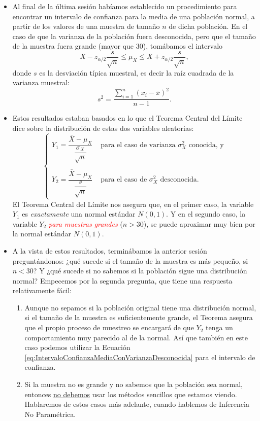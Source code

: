 \begin{itemize}

    \item Al final de la última sesión habíamos establecido un procedimiento para encontrar un intervalo de confianza para la media de una población normal, a partir de los valores de una muestra de tamaño $n$ de dicha población. En el caso de que la varianza de la población fuera desconocida, pero que el tamaño de la muestra fuera grande (mayor que $30$), tomábamos el intervalo
        \begin{equation}\label{eq:IntervaloConfianzaMediaConVarianzaDesconocida}
        \bar X-z_{\alpha/2}\dfrac{s}{\sqrt{n}}\leq \mu_X \leq \bar X+z_{\alpha/2}\dfrac{s}{\sqrt{n}},
        \end{equation}
        donde $s$ es la desviación típica muestral, es decir la raíz cuadrada de la varianza muestral:
        \[s^2=\dfrac{\displaystyle\sum_{i=1}^n(x_i-\bar x)^2}{{n-1}}.\]

    \item Estos resultados estaban basados en lo que el Teorema Central del Límite dice sobre la distribución de estas dos variables aleatorias:
        \[\begin{cases}
        Y_1=\dfrac{\bar X-\mu_X}{\dfrac{\sigma_X}{\sqrt{n}}}&\mbox{ para el caso de varianza $\sigma_X^2$ conocida, y}\\[8mm]
        \quad\\
        Y_2=\dfrac{\bar X-\mu_X}{\dfrac{s}{\sqrt{n}}}&\mbox{ para el caso de $\sigma_X^2$ desconocida.}
        \end{cases}
        \]
        El Teorema Central del Límite nos asegura que, en el primer caso, la variable $Y_1$ es {\em exactamente} una normal estándar $N(0,1)$. Y en el segundo caso, la variable $Y_2$ \textcolor{red}{\em para muestras grandes} ($n>30$), se puede aproximar muy bien por la normal estándar $N(0,1)$.

    \item A la vista de estos resultados, terminábamos la anterior sesión preguntándonos: ¿qué sucede si el tamaño de la muestra es más pequeño, si $n<30$? Y ¿qué sucede si no sabemos si la población sigue una distribución normal? Empecemos por la segunda pregunta, que tiene una respuesta relativamente fácil:
            \begin{enumerate}
            \item Aunque no sepamos si la población original tiene una distribución normal, si el tamaño de la muestra es suficientemente grande, el Teorema asegura que el propio proceso de muestreo se encargará de que $Y_2$ tenga un comportamiento muy parecido al de la normal. Así que también en este caso podemos utilizar la Ecuación \ref{eq:IntervaloConfianzaMediaConVarianzaDesconocida} para el intervalo de confianza.
            \item {\sf Si la muestra no es grande y no sabemos que la población sea normal, entonces \underline{no debemos} usar los métodos sencillos que estamos viendo.} Hablaremos de estos casos más adelante, cuando hablemos de Inferencia No Paramétrica.
            \end{enumerate}


\end{itemize}
